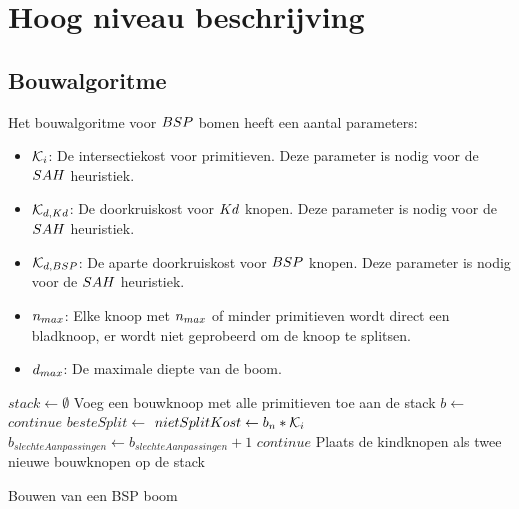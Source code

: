 \section{Hoog niveau beschrijving}
\label{sec:h4-hoog-niveau}
\subsection{Bouwalgoritme}
Het bouwalgoritme voor $BSP$ bomen heeft een aantal parameters:
\begin{itemize}
    \item $\mathcal{K}_i$: De intersectiekost voor primitieven. Deze parameter is nodig voor de $SAH$ heuristiek.
    \item $\mathcal{K}_{d,Kd}$: De doorkruiskost voor $Kd$ knopen. Deze parameter is nodig voor de $SAH$ heuristiek.
    \item $\mathcal{K}_{d,BSP}$: De aparte doorkruiskost voor $BSP$ knopen. Deze parameter is nodig voor de $SAH$ heuristiek.
    \item $n_{max}$: Elke knoop met $n_{max}$ of minder primitieven wordt direct een bladknoop, er wordt niet geprobeerd om de knoop te splitsen.
    \item $d_{max}$: De maximale diepte van de boom.
\end{itemize}
\begin{dutchalgorithm}
    \begin{algorithmic}

        \State $stack\gets \emptyset$
        \State Voeg een bouwknoop met alle primitieven toe aan de stack
            \State $b \gets $
                \State {}
                \State $continue$
            \EndIf
            \State $besteSplit \gets $ 
            \State $nietSplitKost \gets  b_{n}*\mathcal{K}_i$
                \State $b_{slechteAanpassingen} \gets b_{slechteAanpassingen} + 1$
            \EndIf
                \State {}
                \State $continue$
            \EndIf
            \State {}
            \State Plaats de kindknopen als twee nieuwe bouwknopen op de stack
        \EndWhile
    \end{algorithmic}
    \caption{Bouwen van een BSP boom}
\end{dutchalgorithm}


